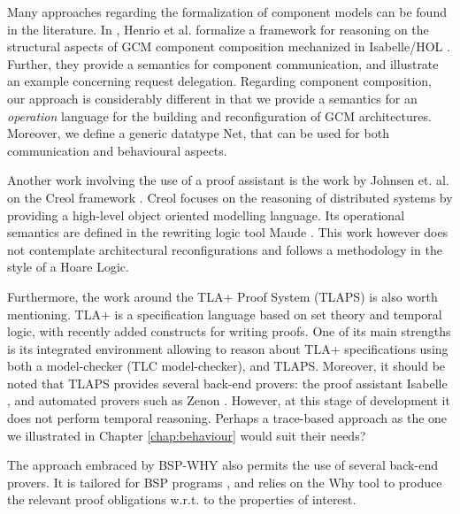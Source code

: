 	Many approaches regarding the formalization of component models can be found in the literature. 
	In \cite{HKK:FMCO09}, Henrio et al.  formalize a framework for reasoning 
	on the structural aspects of \ac{GCM} component composition mechanized in 
	Isabelle/HOL \cite{Nipkow-Paulson-Wenzel:2002}. Further, they provide a semantics
	for component communication, and illustrate an example concerning request delegation.	 
	Regarding component composition, our approach is considerably different
	in that we provide a semantics for an \textit{operation} language for the building 
	and reconfiguration of \ac{GCM} architectures. Moreover, we define a generic
	datatype \textsf{Net}, that can be used for both communication and behavioural
	aspects.	
	
	
	Another work involving the use of a proof assistant is the work by Johnsen et. al. 
	on the \textsf{Creol} framework \cite{johnsen06tcs}. \textsf{Creol} focuses on
	the reasoning of distributed systems by providing a high-level object oriented
	modelling language. Its operational semantics are defined in the rewriting logic tool 
	Maude \cite{Maude2:03}. This work however does not contemplate architectural 
	reconfigurations and follows a methodology in the style of a Hoare Logic. 	
		
		
			
	Furthermore, the work around the TLA+ Proof System (TLAPS) \cite{DBLP:journals/corr/abs-1208-5933} 
	is also worth mentioning. TLA+ is a specification language based on set theory and temporal logic,
	with recently added constructs for writing proofs. One of its main strengths is its integrated
	environment allowing to reason about TLA+ specifications using both a model-checker (TLC model-checker),
	and TLAPS. Moreover, it should be noted that TLAPS provides several back-end provers: the proof
	assistant Isabelle \cite{Nipkow-Paulson-Wenzel:2002}, 
	and automated provers such as Zenon \cite{DBLP:conf/lpar/BonichonDD07}.
	However, at this stage of development it does not perform temporal reasoning. Perhaps
	a trace-based approach as the one we illustrated in Chapter \ref{chap:behaviour} would
	suit their needs?
		
	The approach embraced by \textsf{BSP-WHY} \cite{Fortin:2010:BIL:1863482.1863491} also permits 
	the use of several back-end provers. It is tailored for 
	\textsf{BSP} programs \cite{Valiant:1990:BMP:79173.79181}, and relies on the 
	\textsf{Why} tool \cite{Filliatre:2007:WPD:1770351.1770379} to produce 
	the relevant proof obligations w.r.t. to the properties of interest.
	
